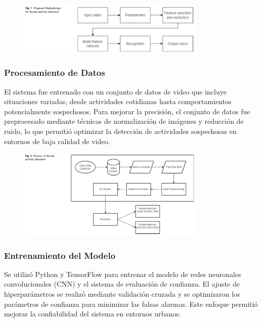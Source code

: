 \documentclass[listof=nochaptergap,12pt,times,authoryear]{report}
\begin{document}
\begin{figure}[h] %
    \centering
    \includegraphics[width=0.8\textwidth]{met3.png} %
    \label{fig:ejemplo} %
\end{figure}


\subsubsection{Procesamiento de Datos}
El sistema fue entrenado con un conjunto de datos de video que incluye situaciones variadas, desde actividades cotidianas hasta comportamientos potencialmente sospechosos. Para mejorar la precisión, el conjunto de datos fue preprocesado mediante técnicas de normalización de imágenes y reducción de ruido, lo que permitió optimizar la detección de actividades sospechosas en entornos de baja calidad de video.

\begin{figure}[h] %
    \centering
    \includegraphics[width=0.8\textwidth]{pro3.png} %
    \label{fig:ejemplo} %
\end{figure}



\subsubsection{Entrenamiento del Modelo}
Se utilizó Python y TensorFlow para entrenar el modelo de redes neuronales convolucionales (CNN) y el sistema de evaluación de confianza. El ajuste de hiperparámetros se realizó mediante validación cruzada y se optimizaron los parámetros de confianza para minimizar las falsas alarmas. Este enfoque permitió mejorar la confiabilidad del sistema en entornos urbanos.
\end{document}
